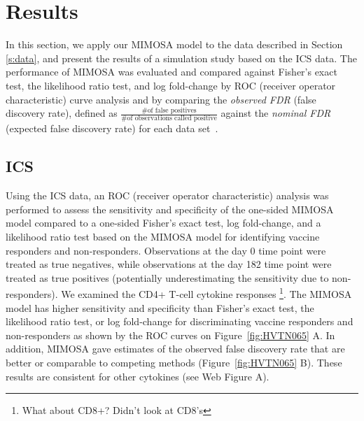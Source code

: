 \documentclass[useAMS,referee,usenatbib]{biom}
\begin{document}
\section{Results}
\label{s:results}
In this section, we apply our MIMOSA model to the data described in Section \ref{s:data}, and present the results of a simulation study based on the ICS data. The performance of MIMOSA was evaluated and compared against Fisher's exact test, the likelihood ratio test, and log fold-change by ROC (receiver operator characteristic) curve analysis and by comparing the \textit{observed FDR} (false discovery rate), defined as $\frac{\text{\# of false positives}}{\text{\# of observations called positive}}$ against the \textit{nominal FDR} (expected false discovery rate) for each data set~\citep{Storey:2002vj}.


\subsection{ICS}
Using the ICS data, an ROC (receiver operator characteristic) analysis was performed to assess the sensitivity and specificity of the one-sided MIMOSA model compared to a one-sided Fisher's exact test, log fold-change, and a likelihood ratio test based on the MIMOSA model for identifying vaccine responders and non-responders. Observations at the day 0 time point were treated as true negatives, while observations at the day 182 time point were treated as true positives (potentially underestimating the sensitivity due to non-responders). We examined the CD4+ T-cell cytokine responses \footnote{What about CD8+? Didn't look at CD8's}. The MIMOSA model has higher sensitivity and specificity than Fisher's exact test, the likelihood ratio test, or log fold-change for discriminating vaccine responders and non-responders  as shown by the ROC curves on Figure~\ref{fig:HVTN065} A. 
In addition, MIMOSA gave estimates of the observed false discovery rate that are better or comparable to competing methods (Figure~\ref{fig:HVTN065} B). These results are consistent for other cytokines (see Web Figure A).
\end{document}
